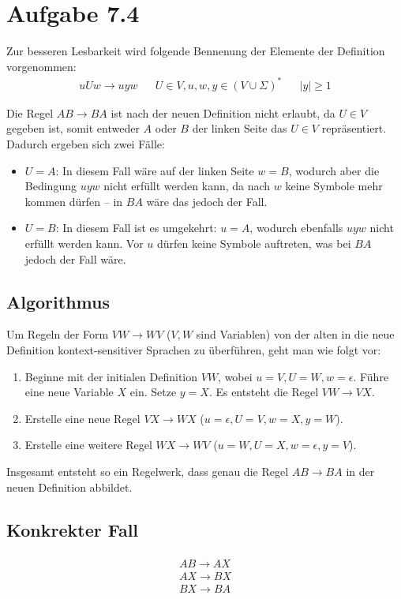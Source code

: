 \documentclass{article}
\begin{document}
\section*{Aufgabe 7.4}
Zur besseren Lesbarkeit wird folgende Bennenung der Elemente der Definition vorgenommen:
\begin{align*}
uUw \rightarrow uyw && U \in V, u,w,y \in \left( V \cup \Sigma \right)^* && |y| \geq 1
\end{align*}

Die Regel $AB\rightarrow BA$ ist nach der neuen Definition nicht erlaubt, da $U \in V$ gegeben ist, somit entweder $A$ oder $B$ der linken Seite das $U \in V$ repräsentiert. Dadurch ergeben sich zwei Fälle:
\begin{itemize}
	\item $U = A$: In diesem Fall wäre auf der linken Seite $w = B$, wodurch aber die Bedingung $uyw$ nicht erfüllt werden kann, da nach $w$ keine Symbole mehr kommen dürfen -- in $BA$ wäre das jedoch der Fall.
  \item $U = B$: In diesem Fall ist es umgekehrt: $u = A$, wodurch ebenfalls $uyw$ nicht erfüllt werden kann. Vor $u$ dürfen keine Symbole auftreten, was bei $BA$ jedoch der Fall wäre.
\end{itemize}

\subsection*{Algorithmus}
Um Regeln der Form $VW \rightarrow WV$ ($V, W$ sind Variablen) von der alten in die neue Definition kontext-sensitiver Sprachen zu überführen, geht man wie folgt vor:

\begin{enumerate}
	\item Beginne mit der initialen Definition $VW$, wobei $u=V, U=W, w=\epsilon$. Führe eine neue Variable $X$ ein. Setze $y=X$. Es entsteht die Regel $VW \rightarrow VX$.
  \item Erstelle eine neue Regel $VX \rightarrow WX$ ($u=\epsilon, U=V, w=X, y=W$). 
  \item Erstelle eine weitere Regel $WX \rightarrow WV$ ($u=W, U=X, w=\epsilon, y=V$).
\end{enumerate}
Insgesamt entsteht so ein Regelwerk, dass genau die Regel $AB \rightarrow BA$ in der neuen Definition abbildet.

\subsection*{Konkrekter Fall}
\begin{align*}
\begin{array}{l}
AB \rightarrow AX \\
AX \rightarrow BX \\
BX \rightarrow BA
\end{array}
\end{align*}
\end{document}
